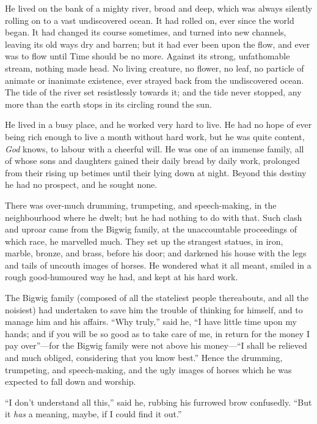 He lived on the bank of a mighty river, broad and deep, which was
always silently rolling on to a vast undiscovered ocean.  It had
rolled on, ever since the world began.  It had changed its course
sometimes, and turned into new channels, leaving its old ways dry
and barren; but it had ever been upon the flow, and ever was to flow
until Time should be no more.  Against its strong, unfathomable
stream, nothing made head.  No living creature, no flower, no leaf,
no particle of animate or inanimate existence, ever strayed back
from the undiscovered ocean.  The tide of the river set resistlessly
towards it; and the tide never stopped, any more than the earth
stops in its circling round the sun.

He lived in a busy place, and he worked very hard to live.  He had
no hope of ever being rich enough to live a month without hard work,
but he was quite content, \emph{God} knows, to labour with a cheerful will.
He was one of an immense family, all of whose sons and daughters
gained their daily bread by daily work, prolonged from their rising
up betimes until their lying down at night.  Beyond this destiny he
had no prospect, and he sought none.

There was over-much drumming, trumpeting, and speech-making, in the
neighbourhood where he dwelt; but he had nothing to do with that.
Such clash and uproar came from the Bigwig family, at the
unaccountable proceedings of which race, he marvelled much.  They
set up the strangest statues, in iron, marble, bronze, and brass,
before his door; and darkened his house with the legs and tails of
uncouth images of horses.  He wondered what it all meant, smiled in
a rough good-humoured way he had, and kept at his hard work.

The Bigwig family (composed of all the stateliest people
thereabouts, and all the noisiest) had undertaken to save him the
trouble of thinking for himself, and to manage him and his affairs.
``Why truly,'' said he, ``I have little time upon my hands; and if you
will be so good as to take care of me, in return for the money I pay
over''---for the Bigwig family were not above his money---``I shall be
relieved and much obliged, considering that you know best.''  Hence
the drumming, trumpeting, and speech-making, and the ugly images of
horses which he was expected to fall down and worship.

``I don't understand all this,'' said he, rubbing his furrowed brow
confusedly.  ``But it \emph{has} a meaning, maybe, if I could find it out.''

